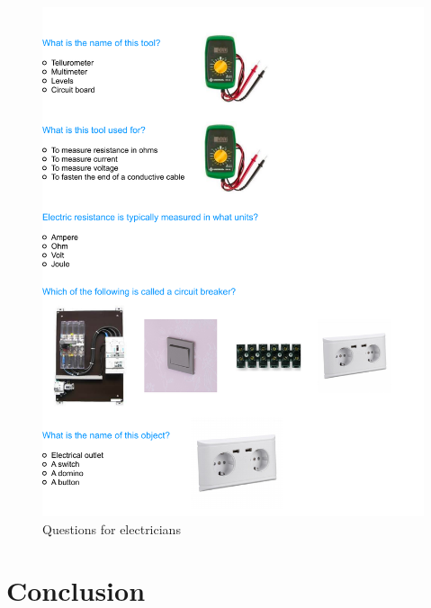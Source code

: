 \documentclass[
  11pt,
a4paper
]{report}
\begin{document}
\begin{figure}
\includegraphics{figures/questionnaire/electricians} \caption{\label{fig:qs_electricians}Questions for electricians}\label{fig:unnamed-chunk-6}
\end{figure}

\chapter{Conclusion}
\end{document}
